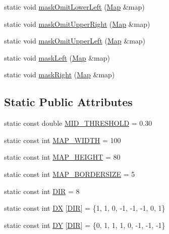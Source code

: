 \begin{DoxyCompactItemize}
\item 
static void \hyperlink{classInterpreter_a849719043f4eef44634a9b5eb3e3561e}{maskOmitLowerLeft} (\hyperlink{classMatrix}{Map} \&map)
\item 
static void \hyperlink{classInterpreter_a83c078f3465a96026dbbc1ef3d7d120b}{maskOmitUpperRight} (\hyperlink{classMatrix}{Map} \&map)
\item 
static void \hyperlink{classInterpreter_a6232cdb6a8637bac127df9d19e8fd705}{maskOmitUpperLeft} (\hyperlink{classMatrix}{Map} \&map)
\item 
static void \hyperlink{classInterpreter_a454e31b3c1d0640be317c82c8b1b659d}{maskLeft} (\hyperlink{classMatrix}{Map} \&map)
\item 
static void \hyperlink{classInterpreter_abdfaacb7134b907d16a412ec1f80364b}{maskRight} (\hyperlink{classMatrix}{Map} \&map)
\end{DoxyCompactItemize}
\subsection*{Static Public Attributes}
\begin{DoxyCompactItemize}
\item 
static const double \hyperlink{classInterpreter_ad1c3ae1b11b176d50b5e8dcbf4b8b09e}{MID\_\-THRESHOLD} = 0.30
\item 
static const int \hyperlink{classInterpreter_a30c4dceff341b5e7cd36fdaba21aeaa9}{MAP\_\-WIDTH} = 100
\item 
static const int \hyperlink{classInterpreter_abda6b21064d50acd844bda3ed551e263}{MAP\_\-HEIGHT} = 80
\item 
static const int \hyperlink{classInterpreter_a0e360d1c91a1328af41fd9a4ede5eaef}{MAP\_\-BORDERSIZE} = 5
\item 
static const int \hyperlink{classInterpreter_a13a73024c4a1e62845a91f686adcd919}{DIR} = 8
\item 
static const int \hyperlink{classInterpreter_ac3d8a1b37737331fbfe7f4cea33cbd04}{DX} \mbox{[}\hyperlink{classInterpreter_a13a73024c4a1e62845a91f686adcd919}{DIR}\mbox{]} = \{1, 1, 0, -\/1, -\/1, -\/1, 0, 1\}
\item 
static const int \hyperlink{classInterpreter_aafc38675c9cad6e87686598dfe9c5758}{DY} \mbox{[}\hyperlink{classInterpreter_a13a73024c4a1e62845a91f686adcd919}{DIR}\mbox{]} = \{0, 1, 1, 1, 0, -\/1, -\/1, -\/1\}
\end{DoxyCompactItemize}

